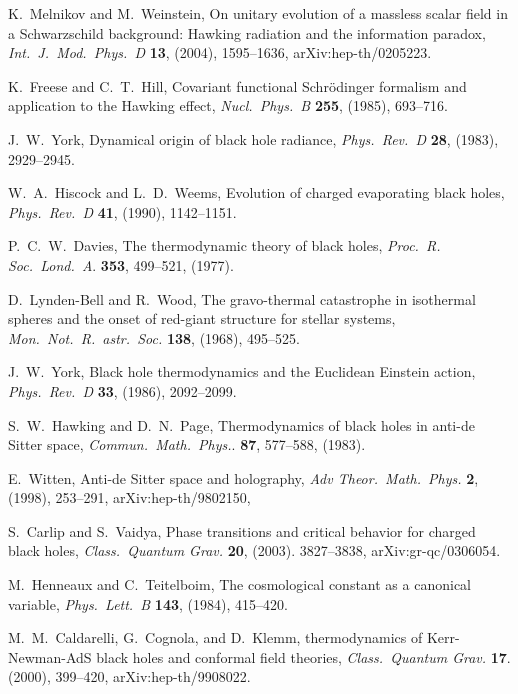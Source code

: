 \documentclass[11pt]{article}
\begin{document}
\begin{thebibliography}{999}
 K.\ Melnikov and M.\ Weinstein, On unitary 
evolution of a massless scalar field in a Schwarzschild background: 
Hawking radiation and the information paradox, \emph{Int.\ J.\
Mod.\ Phys.\ D} {\bf 13}, (2004), 1595--1636, arXiv:hep-th/0205223.

 K.\ Freese and C.~T.\ Hill, Covariant functional 
Schr{\"o}dinger formalism and application to the Hawking effect,
\emph{Nucl.\ Phys.\ B} {\bf 255}, (1985), 693--716.

 J.~W.\ York, Dynamical origin of black hole radiance,
\emph{Phys.\ Rev.\ D} {\bf 28}, (1983), 2929--2945.

 W.~A.\ Hiscock and L.~D.\ Weems, Evolution of 
charged evaporating black holes, \emph{Phys.\ Rev.\ D} {\bf 41}, 
(1990), 1142--1151.

 P.~C.~W.\ Davies, The thermodynamic theory of 
black holes, \emph{Proc.\ R. Soc.\ Lond.\ A}. {\bf 353}, 499--521,
(1977).


 D.\ Lynden-Bell and R.\ Wood, The gravo-thermal 
catastrophe in isothermal spheres and the onset of red-giant structure 
for stellar systems, \emph{Mon.\ Not.\ R.\ astr.\ Soc.} {\bf 138},
(1968), 495--525.

 J.~W.\ York, Black hole thermodynamics and the
 Euclidean Einstein action, \emph{Phys.\ Rev.\ D} {\bf 33}, (1986), 
2092--2099.

 S.~W.\ Hawking and D.~N.\ Page, Thermodynamics 
of black holes in anti-de Sitter space, \emph{Commun.\ Math.\ Phys.}. 
{\bf 87}, 577--588, (1983).

  E.\ Witten, Anti-de Sitter space and holography,
\emph{Adv Theor.\ Math.\ Phys.} {\bf 2}, (1998), 253--291,
arXiv:hep-th/9802150,

 S.\ Carlip and S.\ Vaidya, Phase transitions 
and critical behavior for charged black holes, \emph{Class.\ Quantum
Grav.} {\bf 20}, (2003). 3827--3838, arXiv:gr-qc/0306054.

 M.\ Henneaux and C.\ Teitelboim, The 
cosmological constant as a canonical variable, \emph{Phys.\ Lett.\ B}
{\bf 143}, (1984), 415--420.

 M.~M.\ Caldarelli, G.\ Cognola, and D.\ Klemm,
thermodynamics of Kerr-Newman-AdS black holes and conformal 
field theories, \emph{Class.\ Quantum Grav.} {\bf 17}. (2000), 
399--420, arXiv:hep-th/9908022.


\end{thebibliography}
\end{document}
